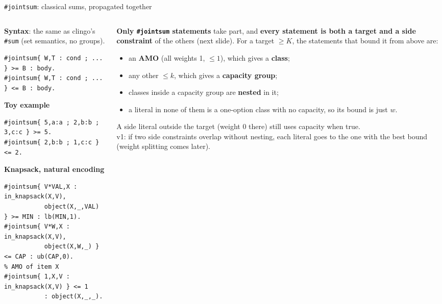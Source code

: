\documentclass[aspectratio=169,11pt]{beamer}
\begin{document}
\begin{frame}[fragile]{\texttt{\#jointsum}: classical sums, propagated together}
\scriptsize
\begin{columns}[T]
\begin{column}{.5\textwidth}
\textbf{Syntax}: the same as clingo's \texttt{\#sum} (set semantics, no groups).
\begin{lstlisting}
#jointsum{ W,T : cond ; ... } >= B : body.
#jointsum{ W,T : cond ; ... } <= B : body.
\end{lstlisting}
\textbf{Toy example}
\begin{lstlisting}
#jointsum{ 5,a:a ; 2,b:b ; 3,c:c } >= 5.
#jointsum{ 2,b:b ; 1,c:c } <= 2.
\end{lstlisting}
\textbf{Knapsack, natural encoding}
\begin{lstlisting}
#jointsum{ V*VAL,X : in_knapsack(X,V),
           object(X,_,VAL) } >= MIN : lb(MIN,1).
#jointsum{ V*W,X : in_knapsack(X,V),
           object(X,W,_) } <= CAP : ub(CAP,0).
% AMO of item X
#jointsum{ 1,X,V : in_knapsack(X,V) } <= 1
           : object(X,_,_).
\end{lstlisting}
\end{column}
\begin{column}{.48\textwidth}
\textbf{Only \texttt{\#jointsum} statements} take part, and \textbf{every statement is both a target and a side constraint}
of the others (next slide). For a target $\ge K$, the statements that bound it from above are:
\begin{itemize}\setlength\itemsep{1pt}
\item an \textbf{AMO} (all weights 1, $\le 1$), which gives a \textbf{class};
\item any other $\le k$, which gives a \textbf{capacity group};
\item classes inside a capacity group are \textbf{nested} in it;
\item a literal in none of them is a one-option class with no capacity, so its bound is just $w$.
\end{itemize}
\vspace{1mm}
A side literal outside the target (weight 0 there) still uses capacity when true.\\[1mm]
v1: if two side constraints overlap without nesting, each literal goes to the one with the best bound (weight splitting comes later).
\end{column}
\end{columns}
\end{frame}
\end{document}
